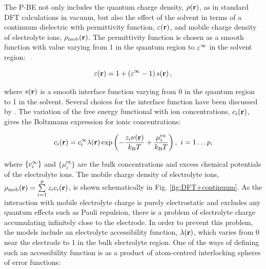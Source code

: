 \documentclass[../main.tex]{subfiles}
\begin{document}
The P-BE not only includes the quantum charge density, $\rho\!\left(\mathbf{r}\right)$, as in standard DFT calculations in vacuum, but also the effect of the solvent in terms of a continuum dielectric with permittivity function, $\varepsilon\!\left(\mathbf{r}\right)$, and mobile charge density of electrolyte ions, $\rho_{\textrm{mob}}\!\left(\mathbf{r}\right)$. The permittivity function is chosen as a smooth function with value varying from 1 in the quantum region to $\varepsilon^\infty$ in the solvent region:\cite{Nattino2019}

\begin{equation}
    \varepsilon\!\left(\mathbf{r}\right)=1+\left(\varepsilon^\infty-1\right)s\!\left(\mathbf{r}\right),
\end{equation}

where $s\!\left(\mathbf{r}\right)$ is a smooth interface function varying from 0 in the quantum region to 1 in the solvent. Several choices for the interface function have been discussed by \citeauthor{Andreussi2012} \cite{Andreussi2012}. The variation of the free energy functional with ion concentrations, $c_i\!\left(\mathbf{r}\right)$, gives the Boltzmann expression for ionic concentrations:

\begin{equation}
    \label{eq:cig}
    \ci\ofrvec = \cif\lambda(\mathbf{r}) \exp \left(-\frac{z_i\nu(\mathbf{r})}{k_{\textrm{B}} T} +\frac{\mu_i^\textrm{ex}}{k_{\textrm{B}} T} \right), \ i=1\dots{}p,
\end{equation}

where $\{c_i^{\infty}\}$ and $\{\mu_i^\textrm{ex}\}$ are the bulk concentrations and excess chemical potentials of the electrolyte ions. The mobile charge density of electrolyte ions, $\rho_{\textrm{mob}}\!\left(\mathbf{r}\right)=\sum\limits_{i=1}^p z_ic_i\!\left(\mathbf{r}\right)$, is shown schematically in Fig. \ref{fig:DFT+continuum}. As the interaction with mobile electrolyte charge is purely electrostatic and excludes any quantum effects such as Pauli repulsion, there is a problem of electrolyte charge accumulating infinitely close to the electrode. In order to prevent this problem, the models include an electrolyte accessibility function, $\lambda\!\left(\mathbf{r}\right)$, which varies from 0 near the electrode to 1 in the bulk electrolyte region.\cite{Fisicaro2017, Sundararaman2018, Stein2019} One of the ways of defining such an accessibility function is as a product of atom-centred interlocking spheres of error functions:\cite{Dziedzic2020}
\end{document}
